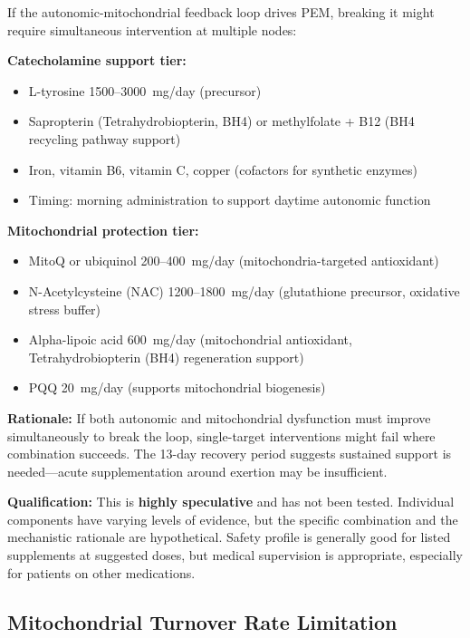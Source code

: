 \begin{speculation}
If the autonomic-mitochondrial feedback loop drives PEM, breaking it might require simultaneous intervention at multiple nodes:

\textbf{Catecholamine support tier:}
\begin{itemize}
    \item L-tyrosine 1500--3000~mg/day (precursor)
    \item Sapropterin (Tetrahydrobiopterin, BH4) or methylfolate + B12 (BH4 recycling pathway support)
    \item Iron, vitamin B6, vitamin C, copper (cofactors for synthetic enzymes)
    \item Timing: morning administration to support daytime autonomic function
\end{itemize}

\textbf{Mitochondrial protection tier:}
\begin{itemize}
    \item MitoQ or ubiquinol 200--400~mg/day (mitochondria-targeted antioxidant)
    \item N-Acetylcysteine (NAC) 1200--1800~mg/day (glutathione precursor, oxidative stress buffer)
    \item Alpha-lipoic acid 600~mg/day (mitochondrial antioxidant, Tetrahydrobiopterin (BH4) regeneration support)
    \item PQQ 20~mg/day (supports mitochondrial biogenesis)
\end{itemize}

\textbf{Rationale:} If both autonomic and mitochondrial dysfunction must improve simultaneously to break the loop, single-target interventions might fail where combination succeeds. The 13-day recovery period suggests sustained support is needed---acute supplementation around exertion may be insufficient.

\textbf{Qualification:} This is \textbf{highly speculative} and has not been tested. Individual components have varying levels of evidence, but the specific combination and the mechanistic rationale are hypothetical. Safety profile is generally good for listed supplements at suggested doses, but medical supervision is appropriate, especially for patients on other medications.
\end{speculation}

\subsection{Mitochondrial Turnover Rate Limitation}
\label{subsec:mito-turnover}

